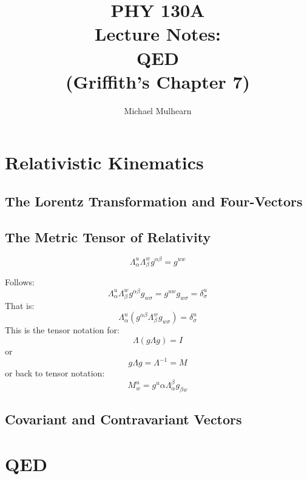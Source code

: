 \documentclass[12pt]{book}
\begin{document}
\title{PHY 130A \\ Lecture Notes: \\ 
QED \\
(Griffith's Chapter 7)}
\author{Michael Mulhearn}

\maketitle

\setcounter{chapter}{3}
\chapter{Relativistic Kinematics}

\section{The Lorentz Transformation and Four-Vectors}

\section{The Metric Tensor of Relativity}
$$\Lambda^u_\alpha \Lambda^w_\beta g^{\alpha \beta} = g^{u w}$$

Follows:
$$\Lambda^u_\alpha \Lambda^w_\beta g^{\alpha \beta}g_{w \sigma} = g^{u w} g_{w \sigma}
= \delta^{u}_{\sigma}$$
That is:
$$\Lambda^u_\alpha (g^{\alpha \beta} \Lambda^w_\beta g_{w \sigma}) = \delta^{u}_{\sigma}$$
This is the tensor notation for:
$$\Lambda(g \Lambda g) = I$$
or
$$g \Lambda g = \Lambda^{-1} = M$$
or back to tensor notation:
$$M^u_w = g^u\alpha \Lambda^\beta_\alpha g_{\beta w}$$

\section{Covariant and Contravariant Vectors}

\setcounter{chapter}{7}
\chapter{QED}
\end{document}
